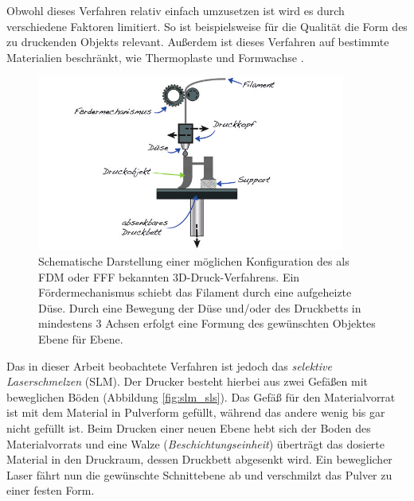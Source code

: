 		Obwohl dieses Verfahren relativ einfach umzusetzen ist wird es durch verschiedene Faktoren
		limitiert. So ist beispielsweise für die Qualität die Form des zu druckenden Objekts
		relevant. Außerdem ist dieses Verfahren auf bestimmte Materialien beschränkt, wie
		Thermoplaste und Formwachse \cite{wikipedia2021fused}.

		\begin{figure}[ht]
			\centering
			\includegraphics[width=0.9\textwidth]{chapter/main/img/FDM.png}
			\caption[Schematische Darstellung des FDM-/FFF-Verfahrens]{Schematische Darstellung
			einer möglichen Konfiguration des als FDM oder FFF bekannten 3D-Druck-Verfahrens. Ein
			Fördermechanismus schiebt das Filament durch eine aufgeheizte Düse. Durch eine
			Bewegung der Düse und/oder des Druckbetts in mindestens 3 Achsen erfolgt eine Formung
			des gewünschten Objektes Ebene für Ebene. \cite[S. 114]{horsch20143d}}
			\label{fig:fdm}
		\end{figure}

		Das in dieser Arbeit beobachtete Verfahren ist jedoch das \emph{selektive Laserschmelzen}
		(SLM). Der Drucker besteht hierbei aus zwei Gefäßen mit beweglichen Böden (Abbildung
		\ref{fig:slm_sls}). Das Gefäß für den Materialvorrat ist mit dem Material in Pulverform
		gefüllt, während das andere wenig bis gar nicht gefüllt ist. Beim Drucken einer neuen
		Ebene hebt sich der Boden des Materialvorrats und eine Walze (\emph{Beschichtungseinheit})
		überträgt das dosierte Material in den Druckraum, dessen Druckbett abgesenkt wird. Ein
		beweglicher Laser fährt nun die gewünschte Schnittebene ab und verschmilzt das Pulver zu
		einer festen Form.

